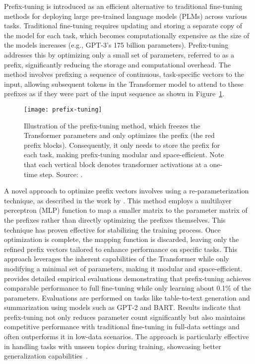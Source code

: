 Prefix-tuning is introduced as an efficient alternative to traditional fine-tuning methods for deploying large pre-trained language models (PLMs) across various tasks.
Traditional fine-tuning requires updating and storing a separate copy of the model for each task, which becomes computationally expensive as the size of the models increases (e.g., GPT-3's 175 billion parameters).
Prefix-tuning addresses this by optimizing only a small set of parameters, referred to as a prefix, significantly reducing the storage and computational overhead.
The method involves prefixing a sequence of continuous, task-specific vectors to the input, allowing subsequent tokens in the Transformer model to attend to these prefixes as if they were part of the input sequence as shown in Figure~\ref{fig:prefix-tuning}.
\begin{figure}[H]
	\centering
	\texttt{[image: prefix-tuning]}
	\caption{Illustration of the prefix-tuning method, which freezes the Transformer parameters and only optimizes the prefix (the red prefix blocks). Consequently, it only needs to store the prefix for each task, making prefix-tuning modular and space-efficient. Note that each vertical block denotes transformer activations at a one-time step. Source: \textcite{li2021prefixtuning}.}
	\label{fig:prefix-tuning}
\end{figure}
A novel approach to optimize prefix vectors involves using a re-parameterization technique, as described in the work by \textcite{li2021prefixtuning}.
This method employs a multilayer perceptron (MLP) function to map a smaller matrix to the parameter matrix of the prefixes rather than directly optimizing the prefixes themselves.
This technique has proven effective for stabilizing the training process.
Once optimization is complete, the mapping function is discarded, leaving only the refined prefix vectors tailored to enhance performance on specific tasks.
This approach leverages the inherent capabilities of the Transformer while only modifying a minimal set of parameters, making it modular and space-efficient.
\textcite{li2021prefixtuning} provides detailed empirical evaluations demonstrating that prefix-tuning achieves comparable performance to full fine-tuning while only learning about 0.1\% of the parameters.
Evaluations are performed on tasks like table-to-text generation and summarization using models such as GPT-2 and BART\@.
Results indicate that prefix-tuning not only reduces parameter count significantly but also maintains competitive performance with traditional fine-tuning in full-data settings and often outperforms it in low-data scenarios.
The approach is particularly effective in handling tasks with unseen topics during training, showcasing better generalization capabilities~\cite{lewis2020bart}.


